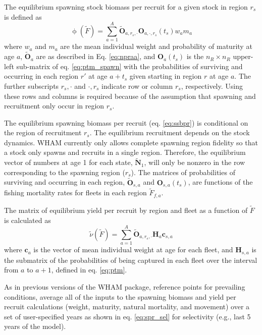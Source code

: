 \documentclass[
]{article}
\begin{document}
The equilibrium spawning stock biomass per recruit for a given stock in region \(r_s\) is defined as
\begin{equation}\label{eq:ssbpr}
 \upphi(\widetilde{F}) = \sum^{A}_{a=1} \widetilde{\mathbf{O}}_{a,r_s,\cdot} \mathbf{O}_{a,\cdot,r_s}(t_s) w_{a} m_{a}
\end{equation}
where \(w_{a}\) and \(m_{a}\) are the mean individual weight and probability of maturity at age \(a\), \(\widetilde{\mathbf{O}}_{a}\) are as described in Eq. \ref{eq:npraa}, and \(\mathbf{O}_{a}(t_s)\) is the \(n_R \times n_R\) upper-left sub-matrix of eq. \ref{eq:ptm_spawn} with the probabilities of surviving and occurring in each region \(r'\) at age \(a+t_s\) given starting in region \(r\) at age \(a\). The further subscripts \(r_s,\cdot\) and \(\cdot,r_s\) indicate row or column \(r_s\), respectively. Using these rows and columns is required because of the assumption that spawning and recruitment only occur in region \(r_s\).

The equilibrium spawning biomass per recruit (eq. \ref{eq:ssbpr}) is conditional on the region of recruitment \(r_s\). The equilibrium recruitment depends on the stock dynamics. WHAM currently only allows complete spawning region fidelity so that a stock only spawns and recruits in a single region. Therefore, the equilibrium vector of numbers at age 1 for each state, \(\widetilde {\mathbf{N}}_{1}\), will only be nonzero in the row corresponding to the spawning region (\(r_s\)). The matrices of probabilities of surviving and occurring in each region, \(\widetilde{\mathbf{O}}_{s,a}\) and \(\mathbf{O}_{s,a}(t_s)\), are functions of the fishing mortality rates for fleets in each region \(\widetilde F_{f,a}\).

The matrix of equilibrium yield per recruit by region and fleet as a function of \(\widetilde F\) is calculated as
\begin{equation}\label{eq:ypr}
 \widetilde{\nu}({\widetilde{F}}) = \sum^{A}_{a=1} \widetilde{\mathbf{O}}_{a,r_s,\cdot} \mathbf{H}_{a} \mathbf{c}_{s,a}
\end{equation}
where \(\mathbf{c}_a\) is the vector of mean individual weight at age for each fleet, and \(\mathbf{H}_{s,a}\) is the submatrix of the probabilities of being captured in each fleet over the interval from \(a\) to \(a+1\), defined in eq. \ref{eq:ptm}.

As in previous versions of the WHAM package, reference points for prevailing conditions, average all of the inputs to the spawning biomass and yield per recruit calculations (weight, maturity, natural mortality, and movement) over a set of user-specified years as shown in eq. \ref{eq:spr_sel} for selectivity (e.g., last 5 years of the model).
\end{document}
